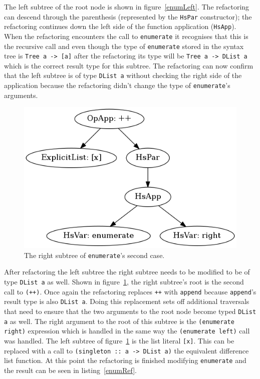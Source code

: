 The left subtree of the root node is shown in figure~\ref{enumLeft}. The refactoring can descend through the parenthesis (represented by the \texttt{HsPar} constructor); the refactoring continues down the left side of the function application (\texttt{HsApp}). When the refactoring encounters the call to \texttt{enumerate} it recognises that this is the recursive call and even though the type of \texttt{enumerate} stored in the syntax tree is \texttt{Tree a -> [a]} after the refactoring its type will be \texttt{Tree a -> DList a} which is the correct result type  for this subtree. The refactoring can now confirm that the left subtree is of type \texttt{DList a} without checking the right side of the application because the refactoring didn't change the type of \texttt{enumerate}'s arguments.

\begin{figure}[h]\label{enumRight}
	\begin{center}
		\includegraphics[scale=.5]{graphVis/Chapter3/enumRight.png}
	\end{center}
	\caption{The right subtree of \texttt{enumerate}'s second case.}
\end{figure}

After refactoring the left subtree the right subtree needs to be modified to be of type \texttt{DList a} as well. Shown in figure~\ref{enumRight}, the right subtree's root is the second call to \texttt{(++)}. Once again the refactoring replaces \texttt{++} with \texttt{append} because \texttt{append}'s result type is also \texttt{DList a}. Doing this replacement sets off additional traversals that need to ensure that the two arguments to the root node become typed \texttt{DList a} as well. The right argument to the root of this subtree is the \texttt{(enumerate right)} expression which is handled in the same way the \texttt{(enumerate left)} call was handled. The left subtree of figure~\ref{enumRight}  is the list literal \texttt{[x]}. This can be replaced with a call to \texttt{(singleton :: a -> DList a)} the equivalent difference list function. At this point the refactoring is finished modifying \texttt{enumerate} and the result can be seen in listing~\ref{enumRef}.

